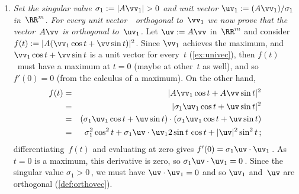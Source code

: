 \begin{enumerate}
\item \emph{Set the singular value \(\sigma_1:=|A\vv_1|>0\) and unit vector \(\uv_1:=(A\vv_1)/\sigma_1\) in~\(\RR^m\). 
For every unit vector~\vv\ orthogonal to~\(\vv_1\) we now prove that the vector~\(A\vv\) is orthogonal to~\(\uv_1\).}
Let \(\uv:=A\vv\) in~\(\RR^m\) and consider \(f(t):=|A(\vv_1\cos t+\vv\sin t)|^2\).
Since \(\vv_1\) achieves the maximum, and \(\vv_1\cos t+\vv\sin t\) is a unit vector for every~\(t\) (\cref{ex:univec}), then \(f(t)\)~must have a maximum at \(t=0\) (maybe at other~\(t\) as well), and so \(f'(0)=0\) (from the calculus of a maximum).
On the other hand, 
\begin{eqnarray*}
f(t)&=&|A\vv_1\cos t+A\vv\sin t|^2
\\&=&|\sigma_1\uv_1\cos t+\uv\sin t|^2
\\&=&(\sigma_1\uv_1\cos t+\uv\sin t)\cdot(\sigma_1\uv_1\cos t+\uv\sin t)
\\&=&\sigma_1^2\cos^2 t+\sigma_1\uv\cdot\uv_12\sin t\,\cos t+|\uv|^2\sin^2 t
\,;
\end{eqnarray*}
differentiating~\(f(t)\) and evaluating at zero gives
\(f'(0)=\sigma_1\uv\cdot\uv_1\)\,.
As \(t=0\) is a maximum, this derivative is zero, so \(\sigma_1\uv\cdot\uv_1=0\)\,.
Since the singular value \(\sigma_1>0\)\,, we must have \(\uv\cdot\uv_1=0\) and so \(\uv_1\) and~\(\uv\) are orthogonal (\cref{def:orthovec}).


\end{enumerate}
